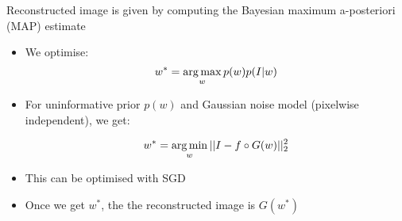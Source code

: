 \begin{frame}{Reconstructed image is given by computing the Bayesian maximum a-posteriori (MAP) estimate\\
}



\begin{itemize}
 \item We optimise:
$$ w^* = \operatorname*{arg\,max}_w p(w)p(I|w)$$

\item For uninformative prior $p(w)$ and Gaussian noise model (pixelwise independent), we get:

$$ w^* = \operatorname*{arg\,min}_w || I - f \circ G (w) ||_2^2$$

\item This can be optimised with SGD

\item Once we get $w^*$, the the reconstructed image is $G(w^*)$

\end{itemize}

\begin{center}
\vt
\brgmoursshortloss
\end{center}
 
\end{frame}
% 


